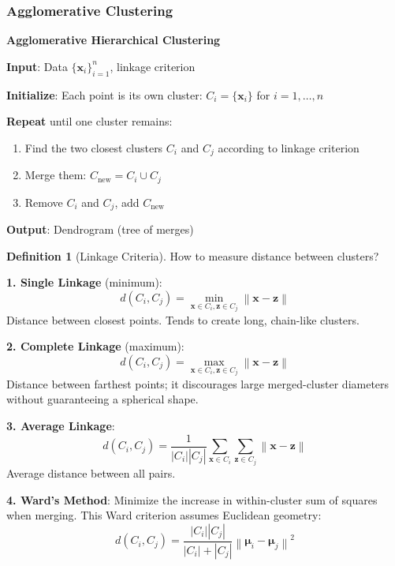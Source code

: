\documentclass[11pt,twoside]{article}
\numberwithin{equation}{section}
\newcommand{\vect}[1]{\bm{#1}}
\newcommand{\norm}[1]{\left\lVert#1\right\rVert}
\theoremstyle{plain}
\theoremstyle{definition}
\newtheorem{definition}[theorem]{Definition}
\theoremstyle{remark}
\begin{document}
\subsubsection{Agglomerative Clustering}

\begin{algorithmbox}
\textbf{Agglomerative Hierarchical Clustering}

\textbf{Input}: Data $\{\vect{x}_i\}_{i=1}^n$, linkage criterion

\textbf{Initialize}: Each point is its own cluster: $C_i = \{\vect{x}_i\}$ for $i=1,\ldots,n$

\textbf{Repeat} until one cluster remains:
\begin{enumerate}
\item Find the two closest clusters $C_i$ and $C_j$ according to linkage criterion
\item Merge them: $C_{\text{new}} = C_i \cup C_j$
\item Remove $C_i$ and $C_j$, add $C_{\text{new}}$
\end{enumerate}

\textbf{Output}: Dendrogram (tree of merges)
\end{algorithmbox}

\begin{definition}[Linkage Criteria]
How to measure distance between clusters?

\textbf{1. Single Linkage} (minimum):
\[
d(C_i, C_j) = \min_{\vect{x} \in C_i, \vect{z} \in C_j} \norm{\vect{x} - \vect{z}}
\]
Distance between closest points. Tends to create long, chain-like clusters.

\textbf{2. Complete Linkage} (maximum):
\[
d(C_i, C_j) = \max_{\vect{x} \in C_i, \vect{z} \in C_j} \norm{\vect{x} - \vect{z}}
\]
Distance between farthest points; it discourages large merged-cluster diameters without guaranteeing a spherical shape.

\textbf{3. Average Linkage}:
\[
d(C_i, C_j) = \frac{1}{|C_i||C_j|}\sum_{\vect{x} \in C_i}\sum_{\vect{z} \in C_j} \norm{\vect{x} - \vect{z}}
\]
Average distance between all pairs.

\textbf{4. Ward's Method}:
Minimize the increase in within-cluster sum of squares when merging. This Ward criterion assumes Euclidean geometry:
\[
d(C_i, C_j) = \frac{|C_i||C_j|}{|C_i| + |C_j|} \norm{\vect{\mu}_i - \vect{\mu}_j}^2
\]
\end{definition}
\end{document}
